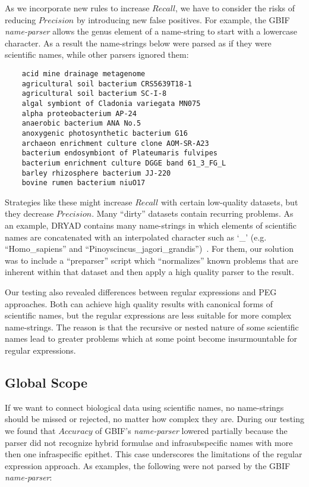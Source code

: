 \documentclass{bmcart}
\begin{document}
As we incorporate new rules to increase $Recall$, we have to consider the risks of reducing $Precision$ by introducing new false positives. For example, the GBIF \textit{name-parser} allows the genus element of a name-string to start with a lowercase character. As a result the name-strings below were parsed as if they were scientific names, while other parsers ignored them:

\vspace{0.5cm}

\begin{verbatim}
    acid mine drainage metagenome
    agricultural soil bacterium CRS5639T18-1
    agricultural soil bacterium SC-I-8
    algal symbiont of Cladonia variegata MN075
    alpha proteobacterium AP-24
    anaerobic bacterium ANA No.5
    anoxygenic photosynthetic bacterium G16
    archaeon enrichment culture clone AOM-SR-A23
    bacterium endosymbiont of Plateumaris fulvipes
    bacterium enrichment culture DGGE band 61_3_FG_L
    barley rhizosphere bacterium JJ-220
    bovine rumen bacterium niuO17
\end{verbatim}

\vspace{0.5cm}

Strategies like these might increase $Recall$ with certain low-quality datasets, but they decrease $Precision$. Many ``dirty'' datasets contain recurring problems. As an example, DRYAD contains many name-strings in which elements of scientific names are concatenated with an interpolated character such as `\_’ (e.g. ``Homo\_sapiens'' and ``Pinoyscincus\_jagori\_grandis'')~\cite{Patterson2016}. For them, our solution was to include a ``preparser'' script which ``normalizes'' known problems that are inherent within that dataset and then apply a high quality parser to the result.

Our testing also revealed differences between regular expressions and PEG approaches. Both can achieve high quality results with canonical forms of scientific names, but the regular expressions are less suitable for more complex name-strings. The reason is that the recursive or nested nature of some scientific names lead to greater problems which at some point become insurmountable for regular expressions.

\subsection*{Global Scope}

If we want to connect biological data using scientific names, no name-strings should be missed or rejected, no matter how complex they are. During our testing we found that $Accuracy$ of GBIF's \textit{name-parser} lowered partially because the parser did not recognize hybrid formulae and infrasubspecific names with more then one infraspecific epithet. This case underscores the limitations of the regular expression approach. As examples, the following were not parsed by the GBIF \textit{name-parser}:
\end{document}
